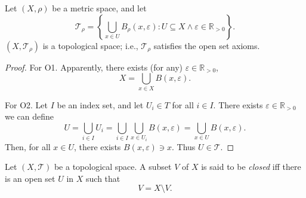\begin{theorem}
	Let $(X, \rho)$ be a metric space, and let
	$$
	\mathcal T_\rho = \left\{ \bigcup_{x \in U} B_\rho (x, \varepsilon) : U \subseteq X \land \varepsilon \in \mathbb R_{> 0} \right\}.
	$$
	$(X, \mathcal T_\rho)$ is a topological space; i.e., $\mathcal T_\rho$ satisfies the open set axioms.
	
	\begin{proof}
		For O1. Apparently, there exists (for any) $\varepsilon \in \mathbb R_{> 0}$,
		$$
		X = \bigcup_{x \in X} B(x, \varepsilon).
		$$
		
		For O2. Let $I$ be an index set, and let $U_i \in T$ for all $i \in I$. There exists $\varepsilon \in \mathbb R_{> 0}$ we can define
		$$
		U = \bigcup_{i \in I} U_i = \bigcup_{i \in I} \bigcup_{x \in U_i} B(x, \varepsilon) = \bigcup_{x \in U} B(x, \varepsilon).
		$$
		Then, for all $x \in U$, there exists $B(x, \varepsilon) \ni x$. Thus $U \in \mathcal T$.
		
	\end{proof}
\end{theorem}



\begin{definition}
	\label{def: closed sets}
	Let $(X, \mathcal T)$ be a topological space. A subset $V$ of $X$ is said to be \textit{closed} iff there is an open set $U$ in $X$ such that
	$$
	V = X \setminus V.
	$$
\end{definition}


